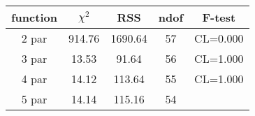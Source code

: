 \begin{tabular}{c|c|c|c|c}
function & $\chi^2$ & RSS & ndof & F-test \\
\hline
2 par & 914.76 & 1690.64 & 57 & CL=0.000 \\
3 par & 13.53 & 91.64 & 56 & CL=1.000 \\
4 par & 14.12 & 113.64 & 55 & CL=1.000 \\
5 par & 14.14 & 115.16 & 54 & \\
\hline
\end{tabular}